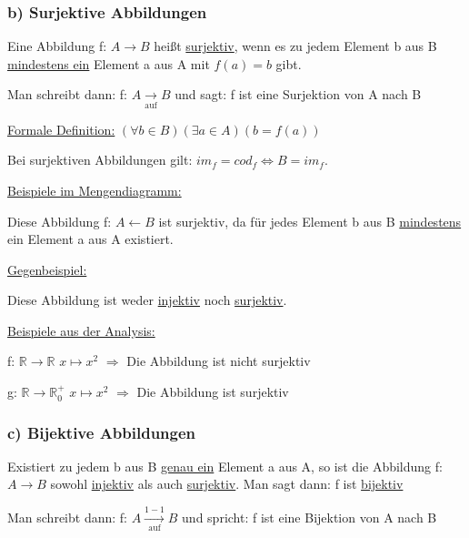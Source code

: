 \documentclass[12pt]{article}
\begin{document}
		\subsubsection*{b) Surjektive Abbildungen}
		
		Eine Abbildung f: $A \rightarrow B$ heißt \underline{surjektiv}, wenn es zu jedem Element b aus B
		\underline{mindestens ein} Element a aus A mit $f(a) = b$ gibt.
		
		Man schreibt dann: {\color{blue}f: $A \xrightarrow[\text{auf}]{} B$} und sagt: {\color{blue}f ist 
		eine Surjektion von A nach B}
		
		\underline{Formale Definition:} $(\forall b \in B) (\exists a \in A) (b = f(a))$
		
		Bei surjektiven Abbildungen gilt: $im_f = cod_f \Leftrightarrow B = im_f$.
		
		\underline{Beispiele im Mengendiagramm:}
		
		
		Diese Abbildung f: $A \leftarrow B$ ist surjektiv, da für jedes Element b aus B \underline{mindestens}
		ein Element a aus A existiert.

		\underline{Gegenbeispiel:}
		
		
		Diese Abbildung ist weder \underline{injektiv} noch \underline{surjektiv}.
		
		\underline{Beispiele aus der Analysis:}
		
		f: $\mathbb{R} \rightarrow \mathbb{R}$ \hspace*{2mm} $x \mapsto x^2$ $\Rightarrow$ Die Abbildung ist nicht surjektiv
		
		g: $\mathbb{R} \rightarrow \mathbb{R}_0^+$ \hspace*{2mm} $x \mapsto x^2$ $\Rightarrow$ Die Abbildung ist surjektiv
		
		\subsubsection*{c) Bijektive Abbildungen}
		
		Existiert zu jedem b aus B \underline{genau ein} Element a aus A, so ist die Abbildung f: $A \rightarrow B$ sowohl
		\underline{injektiv} als auch \underline{surjektiv}. Man sagt dann: {\color{blue}f ist \underline{bijektiv}}
		
		Man schreibt dann: {\color{blue}f: $A \xrightarrow[\text{auf}]{1-1} B$} und spricht: {\color{blue}f ist eine Bijektion von A nach B}
		
\end{document}
